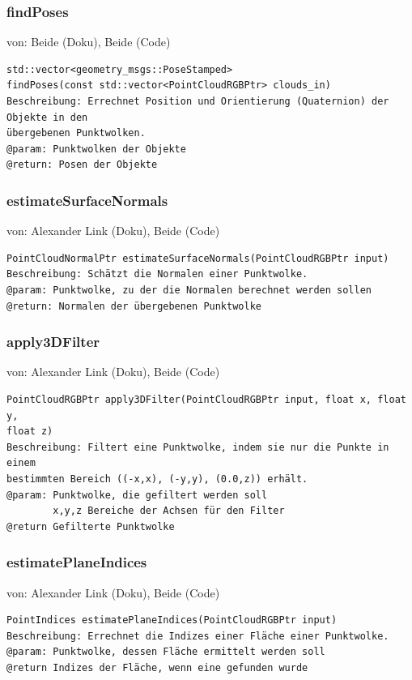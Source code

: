 \documentclass{suturo}
\makeatletter
\newcommand{\chapterauthor}[1]{%
  {\parindent0pt\vspace*{-27pt}%
  \linespread{0}\small\begin{flushright}von: #1\end{flushright}%
  \par\nobreak\vspace*{0pt}}
  \@afterheading%
}
\makeatother
\begin{document}
\subsubsection{findPoses}
\chapterauthor{Beide (Doku), Beide (Code)}
\begin{verbatim}
std::vector<geometry_msgs::PoseStamped> 
findPoses(const std::vector<PointCloudRGBPtr> clouds_in)
Beschreibung: Errechnet Position und Orientierung (Quaternion) der Objekte in den
übergebenen Punktwolken.
@param: Punktwolken der Objekte
@return: Posen der Objekte
\end{verbatim}\label{func:findposes}

\subsubsection{estimateSurfaceNormals}
\chapterauthor{Alexander Link (Doku), Beide (Code)}
\begin{verbatim}
PointCloudNormalPtr estimateSurfaceNormals(PointCloudRGBPtr input)
Beschreibung: Schätzt die Normalen einer Punktwolke.
@param: Punktwolke, zu der die Normalen berechnet werden sollen
@return: Normalen der übergebenen Punktwolke
\end{verbatim}\label{func:estimatesurfacenormals}

\subsubsection{apply3DFilter}
\chapterauthor{Alexander Link (Doku), Beide (Code)}
\begin{verbatim}
PointCloudRGBPtr apply3DFilter(PointCloudRGBPtr input, float x, float y, 
float z)
Beschreibung: Filtert eine Punktwolke, indem sie nur die Punkte in einem
bestimmten Bereich ((-x,x), (-y,y), (0.0,z)) erhält.
@param: Punktwolke, die gefiltert werden soll
		x,y,z Bereiche der Achsen für den Filter
@return Gefilterte Punktwolke
\end{verbatim}\label{func:apply3dfilter}

\subsubsection{estimatePlaneIndices}
\chapterauthor{Alexander Link (Doku), Beide (Code)}
\begin{verbatim}
PointIndices estimatePlaneIndices(PointCloudRGBPtr input)
Beschreibung: Errechnet die Indizes einer Fläche einer Punktwolke.
@param: Punktwolke, dessen Fläche ermittelt werden soll
@return Indizes der Fläche, wenn eine gefunden wurde
\end{verbatim}\label{func:estimateplaneindices}
\end{document}
